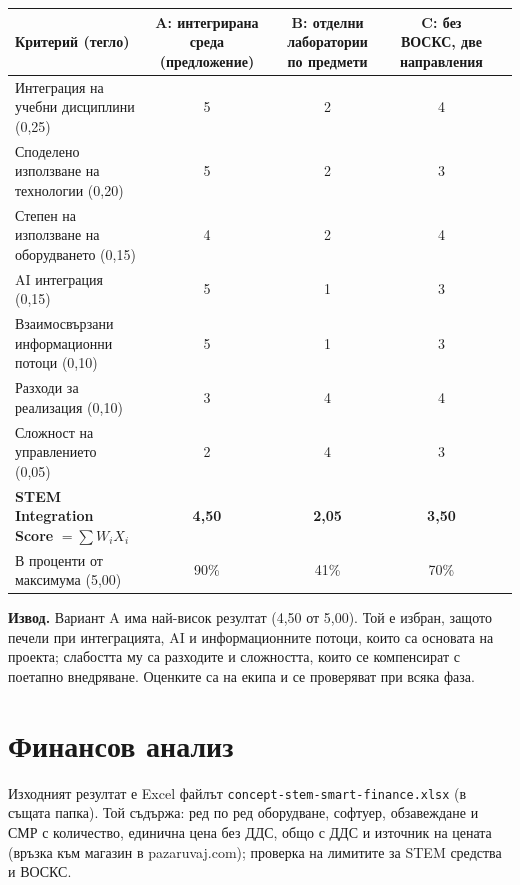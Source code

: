 \documentclass[11pt,a4paper]{article}
\begin{document}
\begin{tabularx}{\textwidth}{@{}>{\raggedright\arraybackslash}p{4.6cm}cccc@{}}
\toprule
Критерий (тегло) & A: интегрирана среда (предложение) & B: отделни лаборатории по предмети & C: без ВОСКС, две направления \\
\midrule
Интеграция на учебни дисциплини (0{,}25) & 5 & 2 & 4 \\
Споделено използване на технологии (0{,}20) & 5 & 2 & 3 \\
Степен на използване на оборудването (0{,}15) & 4 & 2 & 4 \\
AI интеграция (0{,}15) & 5 & 1 & 3 \\
Взаимосвързани информационни потоци (0{,}10) & 5 & 1 & 3 \\
Разходи за реализация (0{,}10) & 3 & 4 & 4 \\
Сложност на управлението (0{,}05) & 2 & 4 & 3 \\
\midrule
\textbf{STEM Integration Score} $=\sum W_i X_i$ & \textbf{4,50} & \textbf{2,05} & \textbf{3,50} \\
В проценти от максимума (5,00) & 90\% & 41\% & 70\% \\
\bottomrule
\end{tabularx}

\textbf{Извод.} Вариант A има най-висок резултат (4,50 от 5,00). Той е избран, защото печели при интеграцията, AI и информационните потоци, които са основата на проекта; слабостта му са разходите и сложността, които се компенсират с поетапно внедряване. Оценките са на екипа и се проверяват при всяка фаза.

\section{Финансов анализ}

Изходният резултат е Excel файлът \texttt{concept-stem-smart-finance.xlsx} (в същата папка). Той съдържа: ред по ред оборудване, софтуер, обзавеждане и СМР с количество, единична цена без ДДС, общо с ДДС и източник на цената (връзка към магазин в pazaruvaj.com); проверка на лимитите за STEM средства и ВОСКС.
\end{document}

